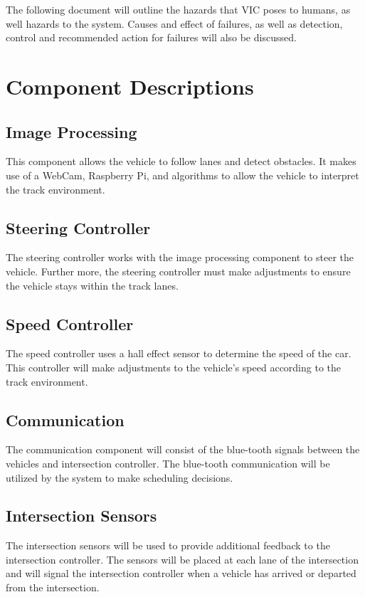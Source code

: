 \documentclass [10pt]{article}
\begin{document}
The following document will outline the hazards that VIC poses to humans, as well hazards to the system. Causes and effect of failures, as well as detection, control and recommended action for failures will also be discussed. 



\section{Component Descriptions} 

\subsection{Image Processing}
This component allows the vehicle to follow lanes and detect obstacles. It makes use of a WebCam, Raspberry Pi, and algorithms to allow the vehicle to interpret the track environment. 
\subsection{Steering Controller}
The steering controller works with the image processing component to steer the vehicle. Further more, the steering controller must make adjustments to ensure the vehicle stays within the track lanes. 
\subsection{Speed Controller} 
The speed controller uses a hall effect sensor to determine the speed of the car. This controller will make adjustments to the vehicle's speed according to the track environment.  
\subsection{Communication} 
The communication component will consist of the blue-tooth signals between the vehicles and intersection controller. The blue-tooth communication will be utilized by the system to make scheduling decisions. 
\subsection{Intersection Sensors}
The intersection sensors will be used to provide additional feedback to the intersection controller. The sensors will be placed at each lane of the intersection and will signal the intersection controller when a vehicle has arrived or departed from the intersection. 
\end{document}
